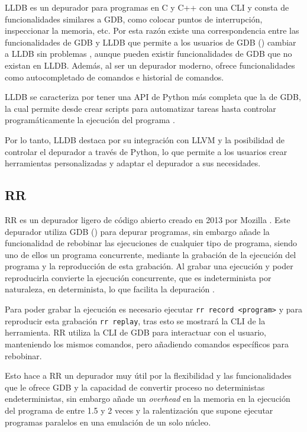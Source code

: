 LLDB es un \gls{depurador} para programas en C y C++ con una \gls{CLI} y consta de funcionalidades similares a GDB, como colocar puntos de interrupción, inspeccionar la memoria, etc. Por esta razón existe una correspondencia entre las funcionalidades de GDB y LLDB que permite a los usuarios de GDB () cambiar a LLDB sin problemas \cite{LLDB}, aunque pueden existir funcionalidades de GDB que no existan en LLDB. Además, al ser un \gls{depurador} moderno, ofrece funcionalidades como autocompletado de comandos e historial de comandos.

LLDB se caracteriza por tener una \gls{API} de Python más completa que la de GDB, la cual permite desde crear \glspl{script} para automatizar tareas hasta controlar programáticamente la ejecución del programa \cite{LLDBPython}. 

Por lo tanto, LLDB destaca por su integración con LLVM y la posibilidad de controlar el depurador a través de Python, lo que permite a los usuarios crear herramientas personalizadas y adaptar el \gls{depurador} a sus necesidades.

\subsection{RR}{\label{subsec:rr}}


RR es un \gls{depurador} ligero de código abierto creado en 2013 por Mozilla \cite{RRWiki}. Este depurador utiliza GDB () para \gls{depurar} programas, sin embargo añade la funcionalidad de rebobinar las ejecuciones de cualquier tipo de programa, siendo uno de ellos un \gls{programa concurrente}, mediante la grabación de la ejecución del programa y la reproducción de esta grabación. Al grabar una ejecución y poder reproducirla convierte la ejecución concurrente, que es \gls{indeterminista} por naturaleza, en \gls{determinista}, lo que facilita la depuración \cite{RR}.

Para poder grabar la ejecución es necesario ejecutar \texttt{rr record <program>} y para reproducir esta grabación \texttt{rr replay}, tras esto se mostrará la \gls{CLI} de la herramienta. RR utiliza la \gls{CLI} de GDB para interactuar con el usuario, manteniendo los mismos comandos, pero añadiendo comandos específicos para rebobinar.

Esto hace a RR un \gls{depurador} muy útil por la flexibilidad y las funcionalidades que le ofrece GDB y la capacidad de convertir \gls{proceso} no deterministas en\glspl{determinista}, sin embargo añade un \textit{\gls{overhead}} en la memoria en la ejecución del programa de entre 1.5 y 2 veces y la ralentización que supone ejecutar programas paralelos en una emulación de un solo núcleo\cite{RR}.

